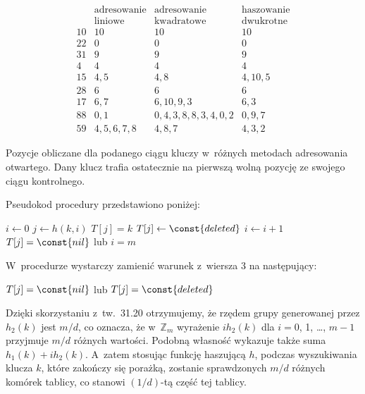 \begin{table}[ht]
	\begin{center}
		\[
			\begin{array}{c|c|c|c}
				& \text{adresowanie} & \text{adresowanie} & \text{haszowanie} \\
				& \text{liniowe} & \text{kwadratowe} & \text{dwukrotne} \\
				\hline
				10 & 10 & 10 & 10 \\
				\hline
				22 & 0 & 0 & 0 \\
				\hline
				31 & 9 & 9 & 9 \\
				\hline
				4 & 4 & 4 & 4 \\
				\hline
				15 & 4,5 & 4,8 & 4,10,5 \\
				\hline
				28 & 6 & 6 & 6 \\
				\hline
				17 & 6,7 & 6,10,9,3 & 6,3 \\
				\hline
				88 & 0,1 & 0,4,3,8,8,3,4,0,2 & 0,9,7 \\
				\hline
				59 & 4,5,6,7,8 & 4,8,7 & 4,3,2
			\end{array}
		\]
	\end{center}
	\caption{Pozycje obliczane dla podanego ciągu kluczy w~różnych metodach adresowania otwartego.
Dany klucz trafia ostatecznie na pierwszą wolną pozycję ze swojego ciągu kontrolnego.} \label{tab:11-1}
\end{table}

\exercise %
Pseudokod procedury  przedstawiono poniżej:
\begin{codebox}
\li	$i\gets0$
\li	\Repeat
		$j\gets h(k,i)$
\li		\If $T[j]=k$
\li			\Then
				$T[j]\gets\const{deleted}$
\li				\Return
			\End
\li		$i\gets i+1$
\li	\Until $T[j]=\const{nil}$ lub $i=m$
\end{codebox}
W~procedurze  wystarczy zamienić warunek z~wiersza 3 na następujący:
\begin{codebox}
\setcounter{codelinenumber}{2}
\li	\If $T[j]=\const{nil}$ lub $T[j]=\const{deleted}$
\end{codebox}

\exercise %
Dzięki skorzystaniu z~tw.\ 31.20 otrzymujemy, że rzędem grupy generowanej przez $h_2(k)$ jest $m/d$, co oznacza, że w~$\mathbb{Z}_m$ wyrażenie $ih_2(k)$ dla $i=0$, 1, \dots, $m-1$ przyjmuje $m/d$ różnych wartości.
Podobną własność wykazuje także suma $h_1(k)+ih_2(k)$.
A~zatem stosując funkcję haszującą $h$, podczas wyszukiwania klucza $k$, które zakończy się porażką, zostanie sprawdzonych $m/d$ różnych komórek tablicy, co stanowi $(1/d)$-tą część tej tablicy.

